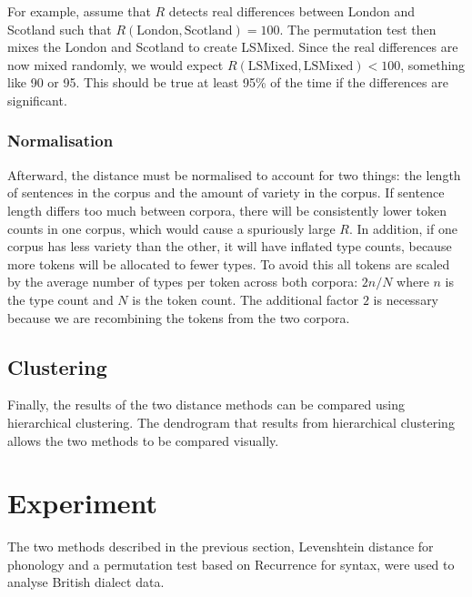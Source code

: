 \documentclass[11pt]{article}
\begin{document}
For example, assume that $R$ detects real differences between London
and Scotland such that $R(\textrm{London},\textrm{Scotland}) =
100$. The permutation test then mixes the London and Scotland to
create LSMixed. Since the real differences are now mixed randomly, we
would expect $R(\textrm{LSMixed}, \textrm{LSMixed}) < 100$, something
like 90 or 95. This should be true at least 95\% of the time if the
differences are significant.

\subsubsection{Normalisation}
Afterward, the distance must be normalised to account for two things:
the length of sentences in the corpus and the amount of variety in the
corpus. If sentence length differs too much between corpora, there
will be consistently lower token counts in one corpus, which would
cause a spuriously large $R$. In addition, if one corpus has less
variety than the other, it will have inflated type counts, because
more tokens will be allocated to fewer types. To avoid
this all tokens are scaled by the average number of types per token
across both corpora: $2n/N$ where $n$ is the type count and $N$ is
the token count. The additional factor $2$ is necessary because we are
recombining the tokens from the two corpora.

\subsection{Clustering}

Finally, the results of the two distance methods can be compared using
hierarchical clustering. The dendrogram that results from hierarchical
clustering allows the two methods to be compared visually.


\section{Experiment}
The two methods described in the previous section, Levenshtein
distance for phonology and a permutation test based on {\sc
  Recurrence} for syntax, were used to analyse British dialect data.
\end{document}
